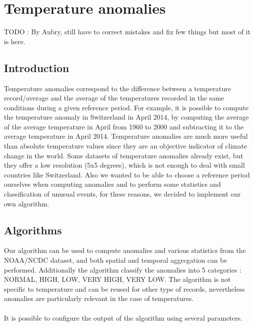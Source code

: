 \section{Temperature anomalies}
TODO : By Aubry, still have to correct mistakes and fix few things but most of it is here.
\subsection{Introduction}

Temperature anomalies correspond to the difference between a temperature record/average
and the average of the temperatures recorded in the same conditions during a given reference period.
For example, it is possible to compute the temperature anomaly in Switzerland in April 2014, by
computing the average of the average temperature in April from 1960 to 2000 and subtracting it to the
average temperature in April 2014. Temperature anomalies are much more useful than absolute temperature values since
 they are an objective indicator of climate change in the world.
Some datasets of temperature anomalies already exist, but they offer a
low resolution (5x5 degrees), which is not enough to deal with small countries like Switzerland.
Also we wanted to be able to choose a reference period ourselves when computing anomalies and to perform some statistics and classification of unusual events, for these reasons,
we decided to implement our own algorithm.

\subsection{Algorithms}

Our algorithm can be used to compute anomalies and various statistics from the NOAA/NCDC dataset, and both spatial and temporal aggregation
can be performed. Additionally the algorithm classify the anomalies into 5 categories : NORMAL, HIGH, LOW, VERY HIGH, VERY LOW.
The algorithm is not specific to temperature and can be reused for other type of records, nevertheless anomalies are particularly relevant in the case of temperatures.\\
\\It is possible to configure the output of the algorithm using several parameters.

